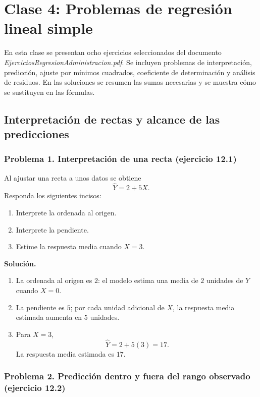 \chapter{Clase 4: Problemas de regresión lineal simple}

En esta clase se presentan ocho ejercicios seleccionados del documento \textit{EjerciciosRegresionAdministracion.pdf}. Se incluyen problemas de interpretación, predicción, ajuste por mínimos cuadrados, coeficiente de determinación y análisis de residuos. En las soluciones se resumen las sumas necesarias y se muestra cómo se sustituyen en las fórmulas.

\section{Interpretación de rectas y alcance de las predicciones}

\subsection{Problema 1. Interpretación de una recta (ejercicio 12.1)}

Al ajustar una recta a unos datos se obtiene
\[
\widehat Y=2+5X.
\]
Responda los siguientes incisos:
\begin{enumerate}
    \item[\textbf{a)}] Interprete la ordenada al origen.
    \item[\textbf{b)}] Interprete la pendiente.
    \item[\textbf{c)}] Estime la respuesta media cuando $X=3$.
\end{enumerate}

\textbf{Solución.}
\begin{enumerate}
    \item[\textbf{a)}] La ordenada al origen es $2$: el modelo estima una media de $2$ unidades de $Y$ cuando $X=0$.
    \item[\textbf{b)}] La pendiente es $5$; por cada unidad adicional de $X$, la respuesta media estimada aumenta en $5$ unidades.
    \item[\textbf{c)}] Para $X=3$,
    \[
    \widehat Y=2+5(3)=17.
    \]
    La respuesta media estimada es $17$.
\end{enumerate}

\subsection{Problema 2. Predicción dentro y fuera del rango observado (ejercicio 12.2)}

